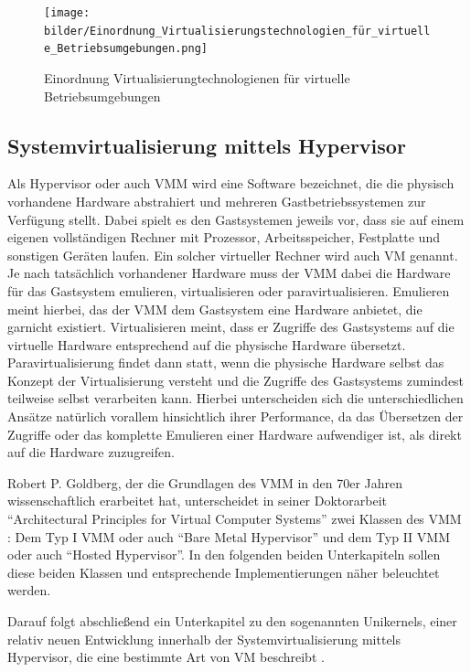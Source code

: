 \begin{figure}[!ht]
  \begin{center}
    \texttt{[image: bilder/Einordnung\_Virtualisierungstechnologien\_für\_virtuelle\_Betriebsumgebungen.png]}
    \caption{Einordnung Virtualisierungtechnologienen für virtuelle Betriebsumgebungen \citep{Hirschbach06}}
  \end{center}
\end{figure}

\subsection{Systemvirtualisierung mittels Hypervisor}

Als Hypervisor oder auch \ac{VMM} wird eine Software bezeichnet, die die physisch vorhandene Hardware abstrahiert und mehreren Gastbetriebssystemen zur Verfügung stellt. Dabei spielt es den Gastsystemen jeweils vor, dass sie auf einem eigenen vollständigen Rechner mit Prozessor, Arbeitsspeicher, Festplatte und sonstigen Geräten laufen. Ein solcher virtueller Rechner wird auch \ac{VM} genannt. Je nach tatsächlich vorhandener Hardware muss der \ac{VMM} dabei die Hardware für das Gastsystem emulieren, virtualisieren oder paravirtualisieren. Emulieren meint hierbei, das der \ac{VMM} dem Gastsystem eine Hardware anbietet, die garnicht existiert. Virtualisieren meint, dass er Zugriffe des Gastsystems auf die virtuelle Hardware entsprechend auf die physische Hardware übersetzt. Paravirtualisierung findet dann statt, wenn die physische Hardware selbst das Konzept der Virtualisierung versteht und die Zugriffe des Gastsystems zumindest teilweise selbst verarbeiten kann. Hierbei unterscheiden sich die unterschiedlichen Ansätze natürlich vorallem hinsichtlich ihrer Performance, da das Übersetzen der Zugriffe oder das komplette Emulieren einer Hardware aufwendiger ist, als direkt auf die Hardware zuzugreifen.

Robert P. Goldberg, der die Grundlagen des \ac{VMM} in den 70er Jahren wissenschaftlich erarbeitet hat, unterscheidet in seiner Doktorarbeit "`Architectural Principles for Virtual Computer Systems"' zwei Klassen des \ac{VMM} \citep[vgl.][S. 22 ff.]{Goldberg73}: Dem Typ I \ac{VMM} oder auch "`Bare Metal Hypervisor"' und dem Typ II \ac{VMM} oder auch "`Hosted Hypervisor"'. In den folgenden beiden Unterkapiteln sollen diese beiden Klassen und entsprechende Implementierungen näher beleuchtet werden.

Darauf folgt abschließend ein Unterkapitel zu den sogenannten Unikernels, einer relativ neuen Entwicklung innerhalb der Systemvirtualisierung mittels Hypervisor, die eine bestimmte Art von \acs{VM} beschreibt \citep[siehe Abstract]{MadMorAnd13}.

